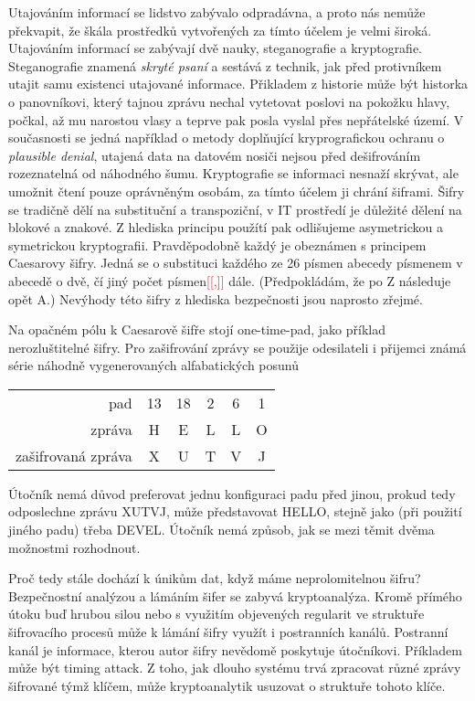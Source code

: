 \documentclass[12pt]{article}
\newcommand\todo[1]{\textcolor{red}{[[#1]]}}
\begin{document}
Utajováním informací se lidstvo zabývalo odpradávna, a proto nás nemůže překvapit, že škála prostředků vytvořených za tímto účelem je velmi široká. Utajováním informací se zabývají dvě nauky, steganografie a kryptografie. Steganografie znamená \textit{skryté psaní} a sestává z technik, jak před protivníkem utajit samu existenci utajované informace. Přikladem z historie může být historka o panovníkovi, který tajnou zprávu nechal vytetovat poslovi na pokožku hlavy, počkal, až mu narostou vlasy a teprve pak posla vyslal přes nepřátelské území. V současnosti se jedná například o metody doplňující kryprografickou ochranu o \textit{plausible denial}, utajená data na datovém nosiči nejsou před dešifrováním rozeznatelná od náhodného šumu.
Kryptografie se informaci nesnaží skrývat, ale umožnit čtení pouze oprávněným osobám, za tímto účelem ji chrání šiframi. Šifry se tradičně dělí na substituční a transpoziční, v IT prostředí je důležité dělení na blokové a znakové. Z hlediska principu použítí pak odlišujeme asymetrickou a symetrickou kryptografii.
Pravděpodobně každý je obeznámen s principem Caesarovy šifry. Jedná se o substituci každého ze 26 písmen abecedy písmenem v abecedě o dvě, čí jiný počet písmen\todo{,} dále. (Předpokládám, že po Z následuje opět A.) Nevýhody této šifry z hlediska bezpečnosti jsou naprosto zřejmé.

Na opačném pólu k Caesarově šifře stojí one-time-pad, jako příklad nerozluštitelné šifry. Pro zašifrování zprávy se použije odesilateli i přijemci známá série náhodně vygenerovaných alfabatických posunů

\begin{table}[h]
\centering
\begin{tabular}{r||c|c|c|c|c}
pad & 13 & 18 & 2 & 6 & 1\\
zpráva & H & E & L & L & O\\\hline
zašifrovaná zpráva & X & U & T & V & J
\end{tabular}
\end{table}

Útočník nemá důvod preferovat jednu konfiguraci padu před jinou, prokud tedy odposlechne zprávu XUTVJ, může představovat HELLO, stejně jako (při použití jiného padu) třeba DEVEL. Útočník nemá způsob, jak se mezi těmit dvěma možnostmi rozhodnout.

Proč tedy stále dochází k únikům dat, když máme neprolomitelnou šifru? Bezpečnostní analýzou a lámáním šifer se zabyvá kryptoanalýza. Kromě přímého útoku buď hrubou silou nebo s využitím objevených regularit ve struktuře šifrovacího procesů může k lámání šifry využít i postranních kanálů. Postranní kanál je informace, kterou autor šifry nevědomě poskytuje útočníkovi. Příkladem může být timing attack. Z toho, jak dlouho systému trvá zpracovat různé zprávy šifrované týmž klíčem, může kryptoanalytik usuzovat o struktuře tohoto klíče.
\end{document}
